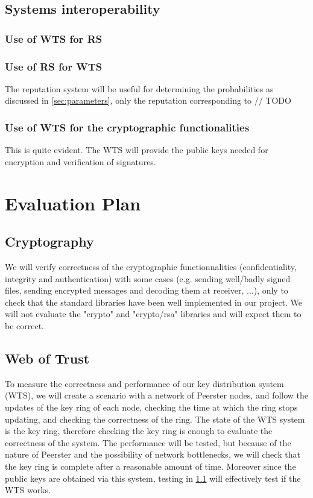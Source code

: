 \documentclass[]{article}
\begin{document}
\subsection{Systems interoperability}

\subsubsection{Use of WTS for RS}

\subsubsection{Use of RS for WTS}
The reputation system will be useful for determining the probabilities as discussed in \ref{sec:parameters}, only the reputation corresponding to // TODO

\subsubsection{Use of WTS for the cryptographic functionalities}
This is quite evident. The WTS will provide the public keys needed for encryption and verification of signatures.

\section{Evaluation Plan}

\subsection{Cryptography}
\label{sec:crypt-test}
We will verify correctness of the cryptographic functionnalities (confidentiality, integrity and authentication) with some cases (e.g. sending well/badly signed files, sending encrypted messages and decoding them at receiver, ...), only to check that the standard libraries have been well implemented in our project. We will not evaluate the "crypto" and "crypto/rsa" libraries and will expect them to be correct.

\subsection{Web of Trust}
To measure the correctness and performance of our key distribution system (WTS), we will create a scenario with a network of Peerster nodes, and follow the updates of the key ring of each node, checking the time at which the ring stops updating, and checking the correctness of the ring. The state of the WTS system is the key ring, therefore checking the key ring is enough to evaluate the correctness of the system. The performance will be tested, but because of the nature of Peerster and the possibility of network bottlenecks, we will check that the key ring is complete after a reasonable amount of time. Moreover since the public keys are obtained via this system, testing in \ref{sec:crypt-test} will effectively test if the WTS works.

{}

\end{document}

